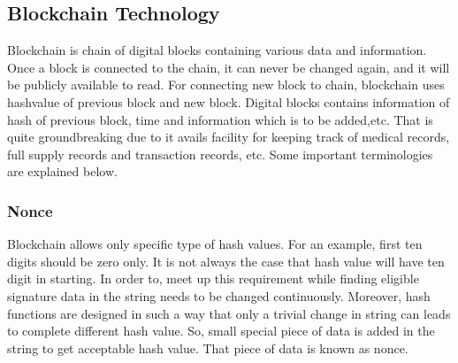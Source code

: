 \documentclass[a4paper,twoside,12pt]{report}
\begin{document}
\begin{spacing}{1.5}
\section{Blockchain Technology}
Blockchain is chain of digital blocks containing various data and information. Once a block is connected to the chain, it can never be changed again, and it will be publicly available to read. For connecting new block to chain, blockchain uses hashvalue of previous block and new block. Digital blocks contains information of hash of previous block, time and information which is to be added,etc. That is quite groundbreaking due to it avails facility for keeping track of medical records, full supply records and transaction records, etc. Some important terminologies are explained below.
\subsubsection{Nonce}
Blockchain allows only specific type of hash values. For an example, first ten digits should be zero only. It is not always the case that hash value will have ten digit in starting. In order to, meet up this requirement while finding eligible signature data in the string needs to be changed continuously. Moreover, hash functions are designed in such a way that only a trivial change in string can leads to complete different hash value. So, small special piece of data is added in the string to get acceptable hash value. That piece of data is known as nonce.   

\end{spacing}
\end{document}
